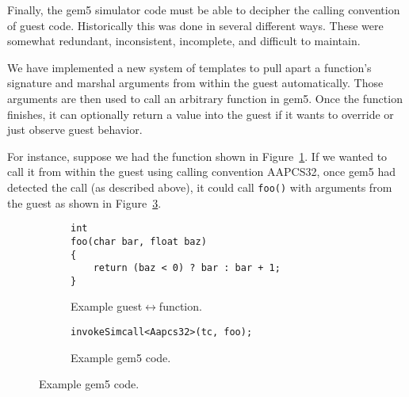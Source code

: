 Finally, the gem5 simulator code must be able to decipher the calling convention of guest code. Historically this was done in several different ways.
These were somewhat redundant, inconsistent, incomplete, and difficult to maintain.

We have implemented a new system of templates to pull apart a function's signature and marshal arguments from within the guest automatically.
Those arguments are then used to call an arbitrary function in gem5.
Once the function finishes, it can optionally return a value into the guest if it wants to override or just observe guest behavior.

For instance, suppose we had the function shown in Figure~\ref{fig:code1}.
If we wanted to call it from within the guest using calling convention AAPCS32, once gem5 had detected the call (as described above), it could call \verb|foo()| with arguments from the guest as shown in Figure~\ref{fig:code2}.

\begin{figure}
    \centering
    \begin{subfigure}{0.48\linewidth}
        \begin{lstlisting}[frame=single]
int
foo(char bar, float baz)
{
    return (baz < 0) ? bar : bar + 1;
}
        \end{lstlisting}
        \caption{Example guest$\leftrightarrow$function.}
        \label{fig:code1}
    \end{subfigure}
    \hspace{3em}
    \begin{subfigure}{0.40\linewidth}
        \begin{lstlisting}[frame=single]
invokeSimcall<Aapcs32>(tc, foo);
        \end{lstlisting}
        \caption{Example gem5 code.}
        \label{fig:code2}
    \end{subfigure}
\end{figure}


